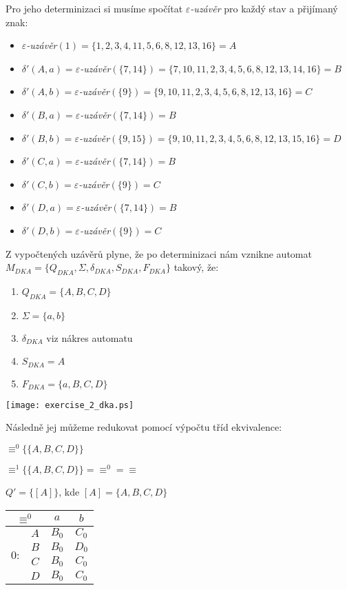 \documentclass[11pt, a4paper]{article}
\begin{document}
\noindent Pro jeho determinizaci si musíme spočítat $\varepsilon$\textit{-uzávěr} pro každý stav a přijímaný znak:
\begin{itemize}[label={},noitemsep]
	\item $\varepsilon$\textit{-uzávěr}$(1) = \{1, 2, 3, 4, 11, 5, 6, 8, 12, 13, 16\} = A$
	\item $\delta'(A, a) = \varepsilon$\textit{-uzávěr}$(\{7, 14\}) = \{7, 10, 11, 2, 3, 4, 5, 6, 8, 12, 13, 14, 16\} = B$
	\item $\delta'(A, b) = \varepsilon$\textit{-uzávěr}$(\{9\}) = \{9, 10, 11, 2, 3, 4, 5, 6, 8, 12, 13, 16\} = C$
	\item $\delta'(B, a) = \varepsilon$\textit{-uzávěr}$(\{7, 14\}) = B$
	\item $\delta'(B, b) = \varepsilon$\textit{-uzávěr}$(\{9, 15\}) = \{9, 10, 11, 2, 3, 4, 5, 6, 8, 12, 13, 15, 16\} = D$
	\item $\delta'(C, a) = \varepsilon$\textit{-uzávěr}$(\{7, 14\}) = B$
	\item $\delta'(C, b) = \varepsilon$\textit{-uzávěr}$(\{9\}) = C$
	\item $\delta'(D, a) = \varepsilon$\textit{-uzávěr}$(\{7, 14\}) = B$
	\item $\delta'(D, b) = \varepsilon$\textit{-uzávěr}$(\{9\}) = C$
\end{itemize}

\noindent Z vypočtených uzávěrů plyne, že po determinizaci nám vznikne automat $M_{DKA} = \{Q_{DKA}, \Sigma, \delta_{DKA}, S_{DKA}, F_{DKA}\}$ takový, že:
\begin{enumerate}
	\item $ Q_{DKA} = \{A, B, C, D\}$
	\item $ \Sigma = \{a, b\}$
	\item $ \delta_{DKA} $ viz nákres automatu
	\item $ S_{DKA} = A$
	\item $ F_{DKA} = \{a, B, C, D\}$
\end{enumerate}
\begin{center}
	\texttt{[image: exercise\_2\_dka.ps]}
\end{center}

\noindent Následně jej můžeme redukovat pomocí výpočtu tříd ekvivalence:

\begin{multicols}{2}
	$\equiv^0 \{\{A, B, C, D\}\}$

	$\equiv^1 \{\{A, B, C, D\}\} = \equiv^0 = \equiv$

	$Q' = \{[A]\}$, kde $[A] = \{A, B, C, D\}$
	\columnbreak

	\begin{tabular}{|cc|cc|}
		\hline
		\multicolumn{2}{|c}{$\equiv^0$}& $a$ & $b$ \\
		\hline
		\multirow{4}{*}{0:} & $A$ & $B_0$ & $C_0$ \\
		                    & $B$ & $B_0$ & $D_0$ \\
		                    & $C$ & $B_0$ & $C_0$ \\
		                    & $D$ & $B_0$ & $C_0$ \\
		\hline
	\end{tabular}
\end{multicols}
\end{document}
